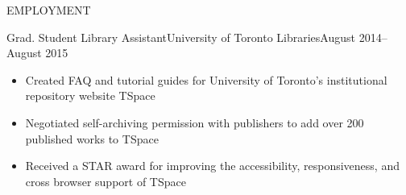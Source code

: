 \documentclass[]{mcdowellcv}
\begin{document}
\begin{cvsection}{EMPLOYMENT}
  \begin{cvsubsection}{Grad. Student Library Assistant}{University of Toronto Libraries}{August 2014--August 2015}
    \begin{itemize}
      \item Created FAQ and tutorial guides for University of Toronto's institutional
            repository website TSpace
      \item Negotiated self-archiving permission with publishers to add over 200 published
            works to TSpace
      \item Received a STAR award for improving the accessibility, responsiveness, and
            cross browser support of TSpace
    \end{itemize}
  \end{cvsubsection}

\end{cvsection}
\end{document}
